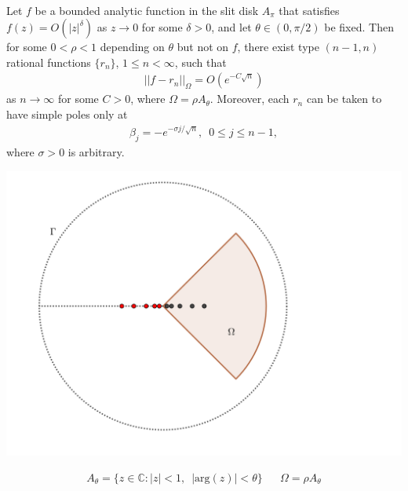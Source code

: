 \documentclass{seminar}
\begin{document}
\begin{slide} %
{} \small \\

Let $f$ be a bounded analytic function in the slit disk $A_\pi$ that satisfies $f(z)=O(|z|^\delta)$ as $z \to 0$ for some $\delta > 0$, and let $\theta \in (0,\pi /2)$ be fixed. Then for some $0< \rho < 1$ depending on $\theta$ but not on $f$, there exist type $(n-1,n)$ rational functions $\{r_n\}$, $1 \leq n < \infty$, such that
	\begin{align*}
	||f-r_n||_\Omega = O(e^{-C \sqrt{n}})
	\end{align*}
as $n \to \infty $ for some $C>0$, where $\Omega = \rho A_\theta$. Moreover, each $r_n$ can be taken to have simple poles only at
	\begin{align*}
	\beta_j = -e^{-\sigma j/\sqrt{n}}, \enspace 0\leq j \leq n-1,
	\end{align*}
where $\sigma >0$ is arbitrary.
\end{slide} %




\begin{slide} %
\begin{center}
\includegraphics[scale=0.8]{./PNG/A_theta_illust}
\end{center}

\begin{align*}
A_\theta=\{z \in \mathds{C} : |z|<1,\enspace |\mathrm{arg}(z)|<\theta \} &&
\Omega = \rho A_\theta
\end{align*}
\end{slide} %
\end{document}
